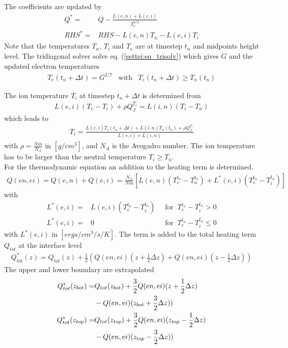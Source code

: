 %
The coefficients are updated by
%
\begin{align}
  Q^* = & Q - \frac{L(e,n) + L(e,i)}{T_e^{5/2}} \\
  RHS^* = & RHS - L(e,n) T_n - L(e,i) T_i
\end{align}
%
Note that the temperatures $T_n$, $T_i$ and $T_e$ are at timestep
$t_n$ and midpoints height level. The tridiagonal solver solve
eq. (\ref{settei:eq_trisolv}) which gives $G$ and the updated
electron temperatures
%
\begin{align}
  T_e(t_n+\Delta t) = G^{2/7} \;\;\; \text{with} \;\;\; T_e(t_n+\Delta t) \geq T_n(t_n)
\end{align}
%

The ion temperature $T_i$ at timestep $t_n+\Delta t$ is determined
from
%
\begin{align}
  L(e,i) (T_e -T_i) + \rho Q_J^{T_i} = L(i,n)(T_i - T_n)
\end{align}
%
which leads to
%
\begin{align}
  T_i = \frac{L(e,i)T_e(t_n+\Delta t) + L(i,n)T_n(t_n) + \rho Q_J^{T_i}}{L(e,i)+L(i,n)}
\end{align}
%
with $\rho = \frac{N \overline{m}}{N_A}$ in $[g/cm^3]$,
and $N_A$ is the Avogadro number. The ion temperature has to be
larger than the neutral temperature $T_i \geq T_n$. \\

For the thermodynamic equation an addition to the heating term is determined.
%
\begin{align}
  Q(en,ei)=Q(e,n) + Q(e,i) = \frac{N_A}{N \overline{m}}\left[ L(e,n) (T_e^{t_n} - T_n^{t_n}) +
  L^*(e,i) (T_e^{t_n} - T_i^{t_n}) \right]
\end{align}
%
with
%
\begin{align}
  L^* (e,i) = &L(e,i)(T_e^{t_n} - T_i^{t_n}) \; \; & \text{for} \; \; T_e^{t_n} - T_i^{t_n} > 0 \\
  L^* (e,i) = &0                 \; \; & \text{for} \; \; T_e^{t_n} - T_i^{t_n} \leq 0
\end{align}
%
with $L^* (e,i)$ in $[ergs/cm^3/s/K]$. 
The term is added to the total heating term $Q_{tot}$
at the interface level
%
\begin{align}
  Q_{tot}^*(z) = Q_{tot}(z) + \frac{1}{2} (Q(en,ei)(z+\frac{1}{2} \Delta z) +
      Q(en,ei)(z-\frac{1}{2} \Delta z))
\end{align}
%
The upper and lower boundary are extrapolated
%
\begin{align}
  Q_{tot}^*(z_{bot}) = & Q_{tot}(z_{bot}) + \frac{3}{2} Q(en,ei)(z+\frac{1}{2} \Delta z) \notag \\
       {} & -Q(en,ei)(z_{bot}+\frac{3}{2} \Delta z)) \\
  Q_{tot}^*(z_{top}) = & Q_{tot}(z_{top}) + \frac{3}{2}
  Q(en,ei)(z_{top}-\frac{1}{2} \Delta z) \notag \\
       {} & -Q(en,ei)(z_{top}-\frac{3}{2} \Delta z))
\end{align}
%
